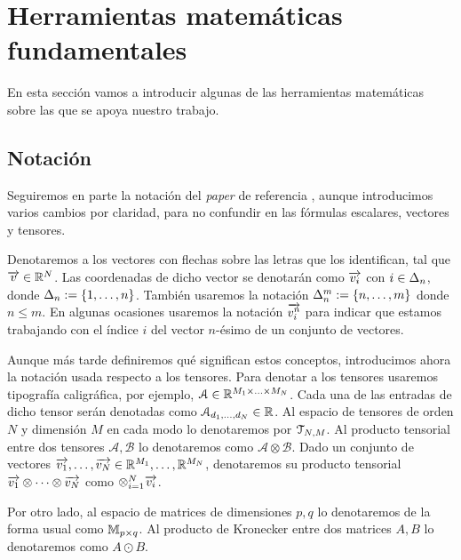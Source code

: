 
\chapter{Herramientas matemáticas fundamentales} \label{ch:matematicas_fundamentales}

En esta sección vamos a introducir algunas de las herramientas matemáticas sobre las que se apoya nuestro trabajo.

\section{Notación}

Seguiremos en parte la notación del \textit{paper} de referencia \cite{matematicas:principal}, aunque introducimos varios cambios por claridad, para no confundir en las fórmulas escalares, vectores y tensores.

Denotaremos a los vectores con flechas sobre las letras que los identifican, tal que $\overrightarrow{v} \in \mathbb{R}^N$. Las coordenadas de dicho vector se denotarán como $\overrightarrow{v_i}$ con $i \in \Delta_{n}$, donde $\Delta_{n} := \{1, \ldots, n\}$. También usaremos la notación $\Delta_{n}^{m} := \{n, \ldots, m\}$ donde $n \leq m$. En algunas ocasiones usaremos la notación $\overrightarrow{v_i^n}$ para indicar que estamos trabajando con el índice $i$ del vector $n$-ésimo de un conjunto de vectores.

Aunque más tarde definiremos qué significan estos conceptos, introducimos ahora la notación usada respecto a los tensores. Para denotar a los tensores usaremos tipografía caligráfica, por ejemplo, $\mathcal{A} \in \mathbb{R}^{M_1 \times \ldots \times M_N}$. Cada una de las entradas de dicho tensor serán denotadas como $\mathcal{A}_{d_1, \ldots, d_N} \in \mathbb{R}$. Al espacio de tensores de orden $N$ y dimensión $M$ en cada modo lo denotaremos por $\mathcal{T}_{N, M}$. Al producto tensorial entre dos tensores $\mathcal{A}, \mathcal{B}$ lo denotaremos como $\mathcal{A} \otimes \mathcal{B}$. Dado un conjunto de vectores $\overrightarrow{v_1}, \ldots, \overrightarrow{v_N} \in \mathbb{R}^{M_1}, \ldots, \mathbb{R}^{M_N}$, denotaremos su producto tensorial $\overrightarrow{v_1} \otimes \cdots \otimes \overrightarrow{v_N}$ como $\otimes_{i = 1}^N \overrightarrow{v_i}$.

Por otro lado, al espacio de matrices de dimensiones $p, q$ lo denotaremos de la forma usual como  $\mathbb{M}_{p \times q}$. Al producto de Kronecker entre dos matrices $A, B$ lo denotaremos como $A \odot B$.

